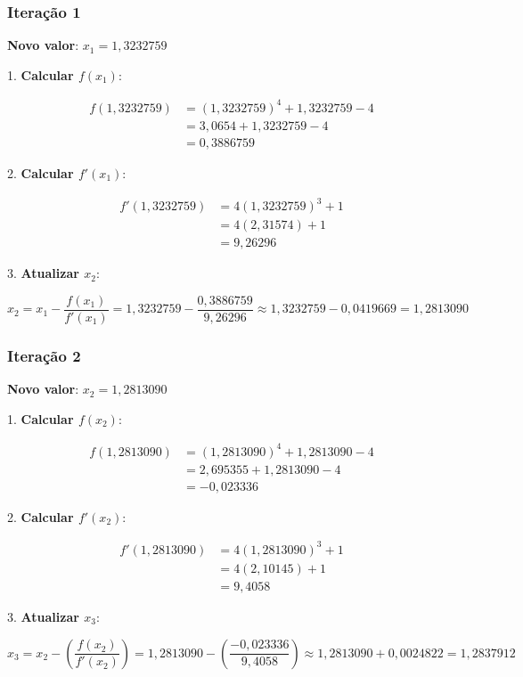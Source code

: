 \documentclass{article}
\begin{document}
\subsubsection*{Iteração 1}

\textbf{Novo valor}: \( x_1 = 1{,}3232759 \)

1. \textbf{Calcular \( f(x_1) \)}:

\[
\begin{aligned}
f(1{,}3232759) &= (1{,}3232759)^4 + 1{,}3232759 - 4 \\
&= 3{,}0654 + 1{,}3232759 - 4 \\
&= 0{,}3886759
\end{aligned}
\]

2. \textbf{Calcular \( f'(x_1) \)}:

\[
\begin{aligned}
f'(1{,}3232759) &= 4(1{,}3232759)^3 + 1 \\
&= 4(2{,}31574) + 1 \\
&= 9{,}26296
\end{aligned}
\]

3. \textbf{Atualizar \( x_2 \)}:

\[
x_2 = x_1 - \frac{f(x_1)}{f'(x_1)} = 1{,}3232759 - \frac{0{,}3886759}{9{,}26296} \approx 1{,}3232759 - 0{,}0419669 = 1{,}2813090
\]

\subsubsection*{Iteração 2}

\textbf{Novo valor}: \( x_2 = 1{,}2813090 \)

1. \textbf{Calcular \( f(x_2) \)}:

\[
\begin{aligned}
f(1{,}2813090) &= (1{,}2813090)^4 + 1{,}2813090 - 4 \\
&= 2{,}695355 + 1{,}2813090 - 4 \\
&= -0{,}023336
\end{aligned}
\]

2. \textbf{Calcular \( f'(x_2) \)}:

\[
\begin{aligned}
f'(1{,}2813090) &= 4(1{,}2813090)^3 + 1 \\
&= 4(2{,}10145) + 1 \\
&= 9{,}4058
\end{aligned}
\]

3. \textbf{Atualizar \( x_3 \)}:

\[
x_3 = x_2 - \left( \frac{f(x_2)}{f'(x_2)} \right) = 1{,}2813090 - \left( \frac{-0{,}023336}{9{,}4058} \right) \approx 1{,}2813090 + 0{,}0024822 = 1{,}2837912
\]
\end{document}
